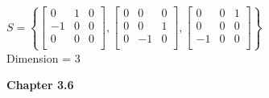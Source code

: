 \documentclass[10pt,twoside,reqno]{article}
\begin{document}
\begin{enumerate}
\begin{center}
$
$$
S = \left\{
\begin{bmatrix}
0&1&0\\
-1&0&0\\
0&0&0\\
\end{bmatrix},
\begin{bmatrix}
0&0&0\\
0&0&1\\
0&-1&0\\
\end{bmatrix},
\begin{bmatrix}
0&0&1\\
0&0&0\\
-1&0&0\\
\end{bmatrix}
\right\}
$$
$ \\ \vspace{2mm}
Dimension = 3
\end{center}
\end{enumerate}
\vspace{5mm}
\textbf{Chapter 3.6}
\end{document}
